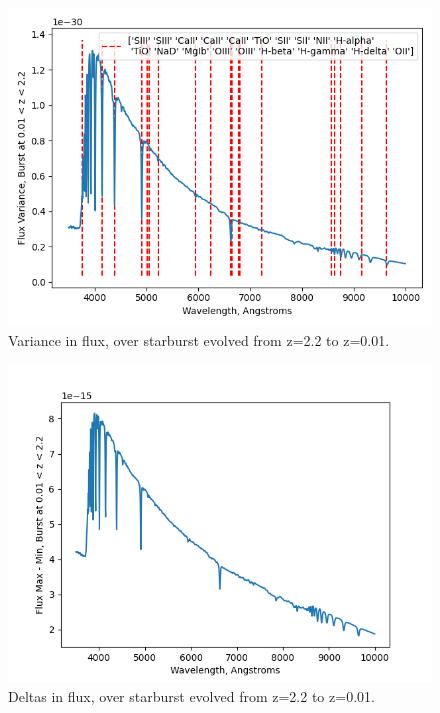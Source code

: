 \documentclass{beamer}
\begin{document}
\begin{frame}{}
  \begin{figure}
    \centering
    \includegraphics[width=\textwidth]{figure}
    \caption{Variance in flux, over starburst evolved from z=2.2 to z=0.01.}
  \end{figure}
\end{frame}

\begin{frame}{}
  \begin{figure}
    \centering
    \includegraphics[width=\textwidth]{figure1}
    \caption{Deltas in flux, over starburst evolved from z=2.2 to z=0.01.}
  \end{figure}
\end{frame}
\end{document}
